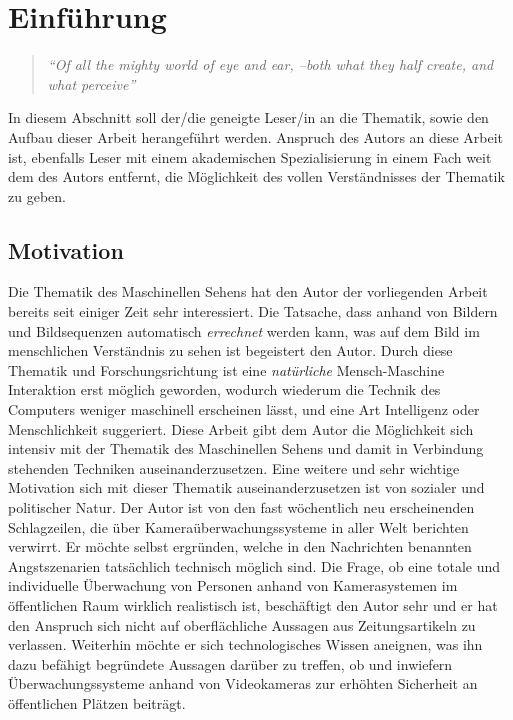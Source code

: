\chapter{Einf\"uhrung}
\begin{quote}
\emph{"`Of all the mighty world of eye and ear, --both what they half create, and what perceive"'\footnotemark}
\end{quote}

In diesem Abschnitt soll der/die geneigte Leser/in an die Thematik, sowie den Aufbau dieser Arbeit herangef\"uhrt werden. Anspruch des Autors an diese Arbeit ist, ebenfalls Leser mit einem akademischen Spezialisierung in einem Fach weit dem des Autors entfernt, die M\"oglichkeit des vollen Verst\"andnisses der Thematik zu geben.

\section{Motivation}
Die Thematik des Maschinellen Sehens hat den Autor der vorliegenden Arbeit bereits seit einiger Zeit sehr interessiert. Die Tatsache, dass anhand von Bildern und Bildsequenzen automatisch \emph{errechnet} werden kann, was auf dem Bild im menschlichen Verständnis zu sehen ist begeistert den Autor. Durch diese Thematik und Forschungsrichtung ist eine \emph{natürliche} Mensch-Maschine Interaktion erst möglich geworden, wodurch wiederum die Technik des Computers weniger maschinell erscheinen lässt, und eine Art Intelligenz oder Menschlichkeit suggeriert. 
Diese Arbeit gibt dem Autor die Möglichkeit sich intensiv mit der Thematik des Maschinellen Sehens und damit in Verbindung stehenden Techniken auseinanderzusetzen.
Eine weitere und sehr wichtige Motivation sich mit dieser Thematik auseinanderzusetzen ist von sozialer und politischer Natur. Der Autor ist von den fast wöchentlich neu erscheinenden Schlagzeilen, die über Kameraüberwachungssysteme in aller Welt berichten verwirrt. Er möchte selbst ergründen, welche in den Nachrichten benannten Angstszenarien tatsächlich technisch möglich sind. Die Frage, ob eine totale und individuelle \"Uberwachung von Personen anhand von Kamerasystemen im öffentlichen Raum wirklich realistisch ist, beschäftigt den Autor sehr und er hat den Anspruch sich nicht auf oberflächliche Aussagen aus Zeitungsartikeln zu verlassen. Weiterhin möchte er sich technologisches Wissen aneignen, was ihn dazu befähigt begründete Aussagen darüber zu treffen, ob und inwiefern \"Uberwachungssysteme anhand von Videokameras zur erhöhten Sicherheit an öffentlichen Plätzen beiträgt.

